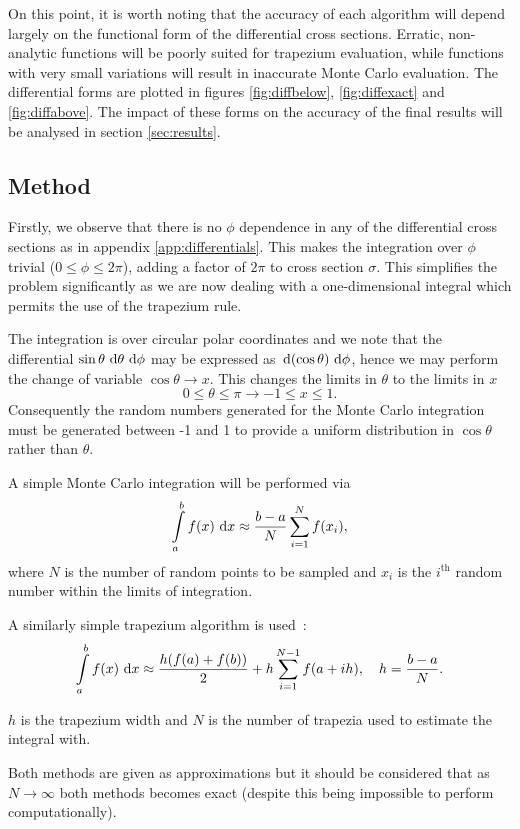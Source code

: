 \documentclass[]{article}
\begin{document}
On this point, it is worth noting that the accuracy of each algorithm will depend largely on the functional form of the differential cross sections. Erratic, non-analytic functions will be poorly suited for trapezium evaluation, while functions with very small variations will result in inaccurate Monte Carlo evaluation. The differential forms are plotted in figures \ref{fig:diffbelow}, \ref{fig:diffexact} and \ref{fig:diffabove}. The impact of these forms on the accuracy of the final results will be analysed in section \ref{sec:results}.

\subsection{Method}\label{ssec:method}

Firstly, we observe that there is no $\phi$ dependence in any of the differential cross sections as in appendix \ref{app:differentials}. This makes the integration over $\phi$ trivial ($0\leq\phi\leq2\pi$), adding a factor of $2\pi$ to cross section $\sigma$. This simplifies the problem significantly as we are now dealing with a one-dimensional integral which permits the use of the trapezium rule.

The integration is over circular polar coordinates and we note that the differential $\sin{\theta}\,\operatorname{d}\!{\theta}\,\operatorname{d}\!{\phi}$ may be expressed as $\,\operatorname{d}\!{(\cos{\theta})}\,\operatorname{d}\!{\phi}$, hence we may perform the change of variable $\cos{\theta} \to x$. This changes the limits in $\theta$ to the limits in $x$ $$0 \leq \theta \leq \pi \to -1 \leq x \leq 1.$$ Consequently the random numbers generated for the Monte Carlo integration must be generated between -1 and 1 to provide a uniform distribution in $\cos{\theta}$ rather than $\theta$.

A simple Monte Carlo integration will be performed via~\cite{ref:gjdaniell}$$\int\limits_{a}^{b}f(x)\,\operatorname{d}\!{x} \approx \frac{b-a}{N}\sum\limits_{i=1}^{N}f(x_{i}),$$ where $N$ is the number of random points to be sampled and $x_{i}$ is the $i^{\mathrm{th}}$ random number within the limits of integration.

A similarly simple trapezium algorithm is used~\cite{ref:gjdaniell}:$$\int\limits_{a}^{b}f(x)\,\operatorname{d}\!{x} \approx \frac{h(f(a) + f(b))}{2} + h\sum\limits_{i=1}^{N-1}f(a+ih),\quad h=\frac{b-a}{N}.$$

$h$ is the trapezium width and $N$ is the number of trapezia used to estimate the integral with.

Both methods are given as approximations but it should be considered that as $N \to \infty$ both methods becomes exact (despite this being impossible to perform computationally).
\end{document}
